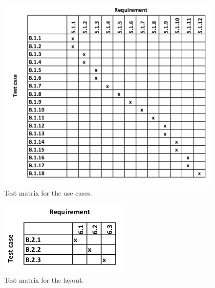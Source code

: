 \documentclass[a4paper]{article}
\begin{document}
\begin{figure}[H]
    \centering
    \includegraphics[scale=0.9]{SVVS-pics/testmatrixUsecases.png}
    \caption{Test matrix for the use cases.}
    \label{fig:testmatrix-usecase}
\end{figure}

\begin{figure}[H]
    \centering
    \includegraphics[scale=0.9]{SVVS-pics/testmatrixLayout.png}
    \caption{Test matrix for the layout.}
    \label{fig:testmatrix-layout}
\end{figure}
\end{document}
